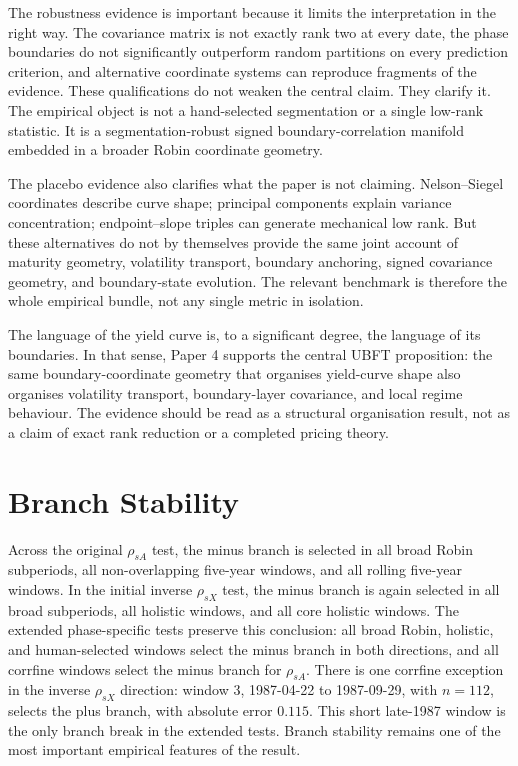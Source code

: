 \documentclass[11pt]{article}
\begin{document}
The robustness evidence is important because it limits the interpretation in the right way. The covariance matrix is not exactly rank two at every date, the phase boundaries do not significantly outperform random partitions on every prediction criterion, and alternative coordinate systems can reproduce fragments of the evidence. These qualifications do not weaken the central claim. They clarify it. The empirical object is not a hand-selected segmentation or a single low-rank statistic. It is a segmentation-robust signed boundary-correlation manifold embedded in a broader Robin coordinate geometry.

The placebo evidence also clarifies what the paper is not claiming. Nelson--Siegel coordinates describe curve shape; principal components explain variance concentration; endpoint--slope triples can generate mechanical low rank. But these alternatives do not by themselves provide the same joint account of maturity geometry, volatility transport, boundary anchoring, signed covariance geometry, and boundary-state evolution. The relevant benchmark is therefore the whole empirical bundle, not any single metric in isolation.

The language of the yield curve is, to a significant degree, the language of its boundaries. In that sense, Paper 4 supports the central UBFT proposition: the same boundary-coordinate geometry that organises yield-curve shape also organises volatility transport, boundary-layer covariance, and local regime behaviour. The evidence should be read as a structural organisation result, not as a claim of exact rank reduction or a completed pricing theory.

\clearpage
\appendix
\renewcommand{\thesection}{Appendix \Alph{section}}

\section{Branch Stability}

Across the original $\rho_{sA}$ test, the minus branch is selected in all broad Robin subperiods, all non-overlapping five-year windows, and all rolling five-year windows. In the initial inverse $\rho_{sX}$ test, the minus branch is again selected in all broad subperiods, all holistic windows, and all core holistic windows. The extended phase-specific tests preserve this conclusion: all broad Robin, holistic, and human-selected windows select the minus branch in both directions, and all corrfine windows select the minus branch for $\rho_{sA}$. There is one corrfine exception in the inverse $\rho_{sX}$ direction: window 3, 1987-04-22 to 1987-09-29, with $n=112$, selects the plus branch, with absolute error $0.115$. This short late-1987 window is the only branch break in the extended tests. Branch stability remains one of the most important empirical features of the result.
\end{document}
